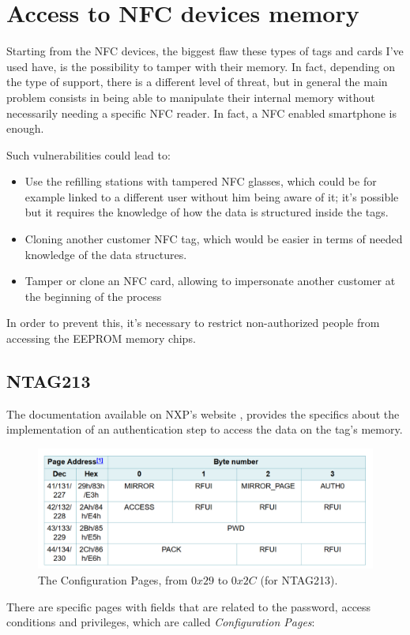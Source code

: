 \documentclass[target=bach,aauheader=,style=]{thud}
\begin{document}
\section{Access to NFC devices memory}
Starting from the NFC devices, the biggest flaw these types of tags and cards I've used have, is the possibility to tamper with their memory. In fact, depending on the type of support, there is a different level of threat, but in general the main problem consists in being able to manipulate their internal memory without necessarily needing a specific NFC reader. In fact, a NFC enabled smartphone is enough.

Such vulnerabilities could lead to:
\begin{itemize}
	\item Use the refilling stations with tampered NFC glasses, which could be for example linked to a different user without him being aware of it; it's possible but it requires the knowledge of how the data is structured inside the tags.
	\item Cloning another customer NFC tag, which would be easier in terms of needed knowledge of the data structures.
	\item Tamper or clone an NFC card, allowing to impersonate another customer at the beginning of the process
\end{itemize}

In order to prevent this, it's necessary to restrict non-authorized people from accessing the EEPROM memory chips.\pagebreak

\subsection{NTAG213}
The documentation available on NXP's website \cite{ntag213}, provides the specifics about the implementation of an authentication step to access the data on the tag's memory.


\begin{figure}[h!]
	\centering
	\includegraphics[scale=0.75]{configurationpages}
	\caption{The Configuration Pages, from $0x29$ to $0x2C$ (for NTAG213).}
	\label{fig:configurationpages}
\end{figure}
There are specific pages with fields that are related to the password, access conditions and privileges, which are called \emph{Configuration Pages}:
\end{document}
